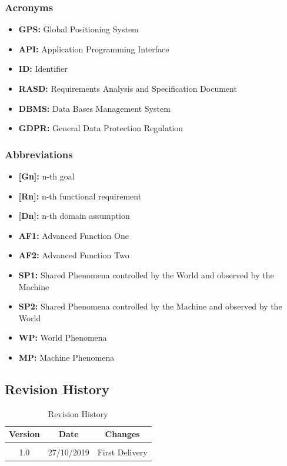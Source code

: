 \documentclass {article}
\begin{document}
		\subsubsection{Acronyms}
		
			\begin{itemize}
				\item {\bf GPS:} Global Positioning System
				\item {\bf API:} Application Programming Interface
				\item {\bf ID:} Identifier
				\item {\bf RASD:} Requirements Analysis and 								Specification Document
				\item {\bf DBMS:} Data Bases Management System
				\item {\bf GDPR:} General Data Protection Regulation
			\end{itemize}

				
				
		\subsubsection{Abbreviations}
		
			\begin{itemize}
				\item {\bf [Gn]:} n-th goal
				\item {\bf [Rn]:} n-th functional requirement
				\item {\bf [Dn]:} n-th domain assumption
				\item {\bf AF1:} Advanced Function One
				\item {\bf AF2:} Advanced Function Two
				\item {\bf SP1:} Shared Phenomena controlled by the 	World and observed by the Machine
				\item {\bf SP2:} Shared Phenomena controlled by the 	Machine and observed by the World
				\item {\bf WP:} World Phenomena
				\item {\bf MP:} Machine Phenomena
			\end{itemize}
			
	\subsection{Revision History}
	
	\begin{table}[ht]
		\centering
		\begin{tabular}{ccc} 
		Version & Date & Changes  \\ 
		\hline
		 \\1.0 & 27/10/2019 & First Delivery
		 \\
		\end{tabular}
		\caption{Revision History}
		\label{default}
	\end{table}
	
\end{document}

